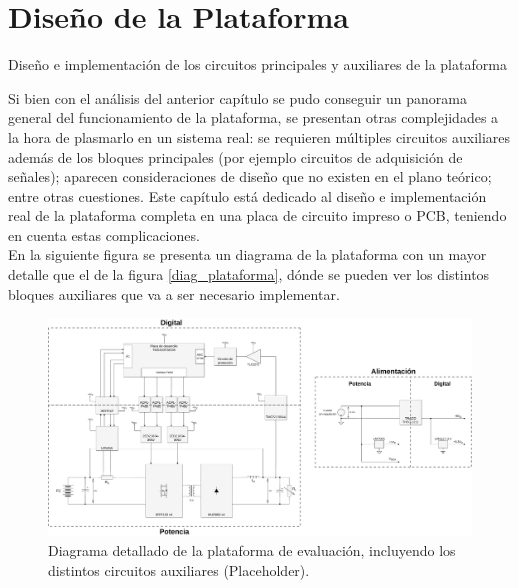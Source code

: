 \section{Diseño de la Plataforma}
\thispagestyle{plain}

\vspace{0.5cm}

\Large\scshape
\begin{center}
    \textrm{Diseño e implementación de los circuitos principales y auxiliares de la plataforma}
\end{center}
\normalfont

\divider

Si bien con el análisis del anterior capítulo se pudo conseguir un panorama general del funcionamiento de la plataforma, se presentan otras complejidades a la hora de plasmarlo en un sistema real: se requieren múltiples circuitos auxiliares además de los bloques principales (por ejemplo circuitos de adquisición de señales); aparecen consideraciones de diseño que no existen en el plano teórico; entre otras cuestiones. Este capítulo está dedicado al diseño e implementación real de la plataforma completa en una placa de circuito impreso o PCB, teniendo en cuenta estas complicaciones.\\

En la siguiente figura se presenta un diagrama de la plataforma con un mayor detalle que el de la figura \ref{diag_plataforma}, dónde se pueden ver los distintos bloques auxiliares que va a ser necesario implementar.\\

\begin{figure}[h]
    \centering
    \includegraphics[scale=0.2]{Imagenes/Plataforma Detallada.pdf}
    \caption{Diagrama detallado de la plataforma de evaluación, incluyendo los distintos circuitos auxiliares (Placeholder).}
    \label{diag_detallado}
\end{figure}